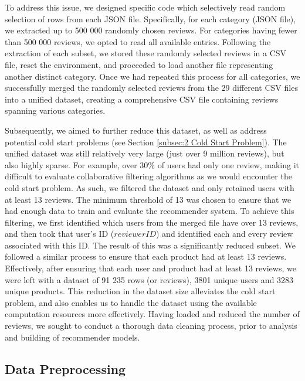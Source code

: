 To address this issue, we designed specific code which selectively read random selection of rows from each JSON file. Specifically, for each category (JSON file), we extracted up to 500 000 randomly chosen reviews. For categories having fewer than 500 000 reviews, we opted to read all available entries. Following the extraction of each subset, we stored these randomly selected reviews in a CSV file, reset the environment, and proceeded to load another file representing another distinct category. Once we had repeated this process for all categories, we successfully merged the randomly selected reviews from the 29 different CSV files into a unified dataset, creating a comprehensive CSV file containing reviews spanning various categories. 

Subsequently, we aimed to further reduce this dataset, as well as address potential cold start problems (see Section \ref{subsec:2 Cold Start Problem}). The unified dataset was still relatively very large (just over 9 million reviews), but also highly sparse. For example, over 30\% of users had only one review, making it difficult to evaluate collaborative filtering algorithms as we would encounter the cold start problem. As such, we filtered the dataset and only retained users with at least 13 reviews. The minimum threshold of 13 was chosen to ensure that we had enough data to train and evaluate the recommender system. To achieve this filtering, we first identified which users from the merged file have over 13 reviews, and then took that user’s ID ($reviewerID$) and identified each and every review associated with this ID. The result of this was a significantly reduced subset. We followed a similar process to ensure that each product had at least 13 reviews. Effectively, after ensuring that each user and product had at least 13 reviews, we were left with a dataset of 91 235 rows (or reviews), 3801 unique users and 3283 unique products. This reduction in the dataset size alleviates the cold start problem, and also enables us to handle the dataset using the available computation resources more effectively. Having loaded and reduced the number of reviews, we sought to conduct a thorough data cleaning process, prior to analysis and building of recommender models.


\subsection{Data Preprocessing}
\label{subsec:3 Data Preprocessing}

